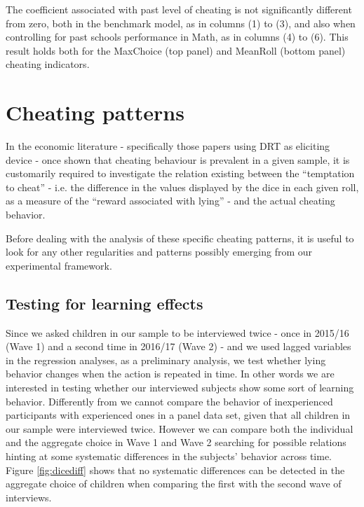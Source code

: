 \documentclass[authoryear, preprint, review, 12pt]{elsarticle}
\begin{document}
The coefficient associated with past level of cheating is not significantly different from zero, both in the benchmark model, as in columns (1) to (3), and also when controlling for past schools performance in Math, as in columns (4) to (6). This result holds both for the MaxChoice (top panel) and MeanRoll (bottom panel) cheating indicators.

\section{Cheating patterns}
\label{sec:cheatpattern}
In the economic literature - specifically those papers using DRT as eliciting device \citep[such as][]{ff13,ariely2015true} - once shown that cheating behaviour is prevalent in a given sample, it is customarily required to investigate the relation existing between the \enquote{temptation to cheat} - i.e. the difference in the values displayed by the dice in each given roll, as a measure of the \enquote{reward associated with lying} - and the actual cheating behavior. 

Before dealing with the analysis of these specific cheating patterns, it is useful to look for any other regularities and patterns possibly emerging from our experimental framework.

\subsection{Testing for learning effects}
\label{subsec:learning}

Since we asked children in our sample to be interviewed twice - once in 2015/16 (Wave 1) and a second time in 2016/17 (Wave 2) - and we used lagged variables in the regression analyses, as a preliminary analysis, we test whether lying behavior changes when the action is repeated in time. In other words we are interested in testing whether our interviewed subjects show some sort of learning behavior. 
Differently from \cite{ff13} we cannot compare the behavior of inexperienced participants with experienced ones in a panel data set, given that all children in our sample were interviewed twice. However we can compare both the individual and the aggregate choice in Wave 1 and Wave 2 searching for possible relations hinting at some systematic differences in the subjects' behavior across time. Figure \ref{fig:dicediff} shows that no systematic differences can be detected in the aggregate choice of children when comparing the first with the second wave of interviews.
\end{document}
